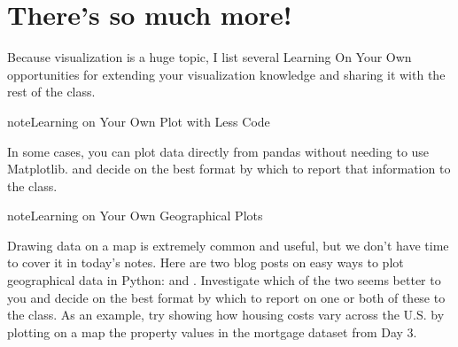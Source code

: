 \documentclass[letterpaper,10pt,english]{jupyterBook}
\begin{document}
\noindent{}


\section{There’s so much more!}
\label{\detokenize{chapter-10-visualization:there-s-so-much-more}}
\sphinxAtStartPar
Because visualization is a huge topic, I list several Learning On Your Own opportunities for extending your visualization knowledge and sharing it with the rest of the class.

\begin{sphinxadmonition}{note}{Learning on Your Own \sphinxhyphen{} Plot with Less Code}

\sphinxAtStartPar
In some cases, you can plot data directly from pandas without needing to use Matplotlib.   and decide on the best format by which to report that information to the class.
\end{sphinxadmonition}

\begin{sphinxadmonition}{note}{Learning on Your Own \sphinxhyphen{} Geographical Plots}

\sphinxAtStartPar
Drawing data on a map is extremely common and useful, but we don’t have time to cover it in today’s notes.  Here are two blog posts on easy ways to plot geographical data in Python:  and .  Investigate which of the two seems better to you and decide on the best format by which to report on one or both of these to the class.  As an example, try showing how housing costs vary across the U.S. by plotting on a map the property values in the mortgage dataset from Day 3.
\end{sphinxadmonition}
\end{document}
